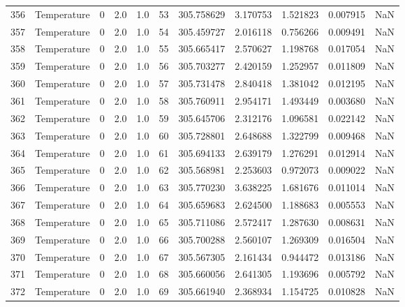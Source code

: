 \begin{tabular}{llrrrrrrrrr}
356 &  Temperature &       0 &  2.0 &  1.0 &   53 &  305.758629 &  3.170753 &  1.521823 &   0.007915 &      NaN \\
357 &  Temperature &       0 &  2.0 &  1.0 &   54 &  305.459727 &  2.016118 &  0.756266 &   0.009491 &      NaN \\
358 &  Temperature &       0 &  2.0 &  1.0 &   55 &  305.665417 &  2.570627 &  1.198768 &   0.017054 &      NaN \\
359 &  Temperature &       0 &  2.0 &  1.0 &   56 &  305.703277 &  2.420159 &  1.252957 &   0.011809 &      NaN \\
360 &  Temperature &       0 &  2.0 &  1.0 &   57 &  305.731478 &  2.840418 &  1.381042 &   0.012195 &      NaN \\
361 &  Temperature &       0 &  2.0 &  1.0 &   58 &  305.760911 &  2.954171 &  1.493449 &   0.003680 &      NaN \\
362 &  Temperature &       0 &  2.0 &  1.0 &   59 &  305.645706 &  2.312176 &  1.096581 &   0.022142 &      NaN \\
363 &  Temperature &       0 &  2.0 &  1.0 &   60 &  305.728801 &  2.648688 &  1.322799 &   0.009468 &      NaN \\
364 &  Temperature &       0 &  2.0 &  1.0 &   61 &  305.694133 &  2.639179 &  1.276291 &   0.012914 &      NaN \\
365 &  Temperature &       0 &  2.0 &  1.0 &   62 &  305.568981 &  2.253603 &  0.972073 &   0.009022 &      NaN \\
366 &  Temperature &       0 &  2.0 &  1.0 &   63 &  305.770230 &  3.638225 &  1.681676 &   0.011014 &      NaN \\
367 &  Temperature &       0 &  2.0 &  1.0 &   64 &  305.659683 &  2.624500 &  1.188683 &   0.005553 &      NaN \\
368 &  Temperature &       0 &  2.0 &  1.0 &   65 &  305.711086 &  2.572417 &  1.287630 &   0.008631 &      NaN \\
369 &  Temperature &       0 &  2.0 &  1.0 &   66 &  305.700288 &  2.560107 &  1.269309 &   0.016504 &      NaN \\
370 &  Temperature &       0 &  2.0 &  1.0 &   67 &  305.567305 &  2.161434 &  0.944472 &   0.013186 &      NaN \\
371 &  Temperature &       0 &  2.0 &  1.0 &   68 &  305.660056 &  2.641305 &  1.193696 &   0.005792 &      NaN \\
372 &  Temperature &       0 &  2.0 &  1.0 &   69 &  305.661940 &  2.368934 &  1.154725 &   0.010828 &      NaN \\

\end{tabular}
